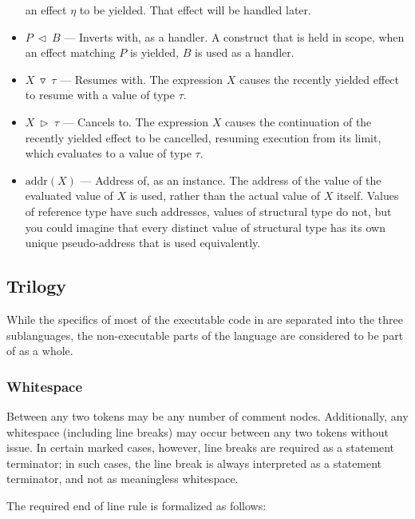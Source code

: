 \begin{itemize}
    an effect $\eta$ to be yielded. That effect will be handled later.
    \item $P\ \triangleleft\ B$ --- Inverts with, as a handler. A construct that is
    held in scope, when an effect matching $P$ is yielded, $B$ is used as a handler.
    \item $X\ \triangledown\ \tau$ --- Resumes with. The expression $X$ causes
    the recently yielded effect to resume with a value of type $\tau$.
    \item $X\ \triangleright\ \tau$ --- Cancels to. The expression $X$ causes the
    continuation of the recently yielded effect to be cancelled, resuming execution
    from its limit, which evaluates to a value of type $\tau$.
    \item $\text{addr}(X)$ --- Address of, as an instance. The address of the value
    of the evaluated value of $X$ is used, rather than the actual value of $X$
    itself. Values of reference type have such addresses, values of structural type
    do not, but you could imagine that every distinct value of structural type has
    its own unique pseudo-address that is used equivalently.
\end{itemize}

\subsection{Trilogy}

While the specifics of most of the executable code in \Trilogy{} are separated into
the three sublanguages, the non-executable parts of the language are considered
to be part of \Trilogy{} as a whole.

\subsubsection{Whitespace}

Between any two tokens may be any number of comment nodes. Additionally,
any whitespace (including line breaks) may occur between any two tokens
without issue. In certain marked cases, however, line breaks are required
as a statement terminator; in such cases, the line break is always interpreted
as a statement terminator, and not as meaningless whitespace.

The required end of line rule is formalized as follows:

\begin{bnf*}
\end{bnf*}


